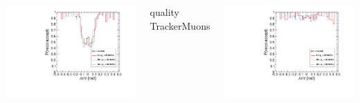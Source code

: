 \documentclass[compress]{beamer}
\begin{document}
\begin{frame}
\begin{columns}
\includegraphics[width=\linewidth]{endcap_dr_bypt_GlobalMuon.pdf}

\centering quality TrackerMuons

\includegraphics[width=\linewidth]{endcap_dr_bypt_TrackerMuon.pdf}
\end{columns}
\end{frame}

\end{document}
